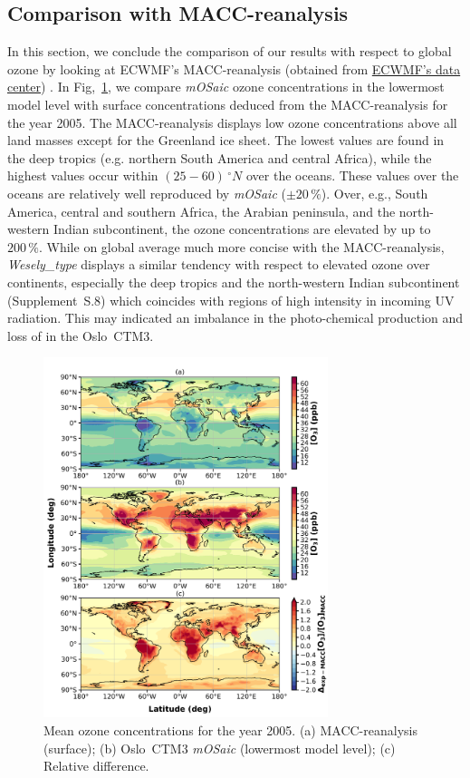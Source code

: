 \documentclass[gmd, manuscript]{copernicus}
\begin{document}
\subsection{Comparison with MACC-reanalysis}
\label{subsec:macc}
In this section, we conclude the comparison of our results with respect to global ozone by looking at ECWMF's MACC-reanalysis (obtained from \href{https://apps.ecmwf.int/datasets/data/macc-reanalysis/levtype=ml/}{ECWMF's data center}) \citep{MACC-II}.
In Fig,~\ref{fig:macc_o3conc}, we compare \emph{mOSaic} ozone concentrations in the lowermost model level with surface concentrations deduced from the MACC-reanalysis for the year 2005. The MACC-reanalysis displays low ozone concentrations above all land masses except for the Greenland ice sheet. The lowest values are found in the deep tropics (e.g. northern South America and central Africa), while the highest values occur within $(25-60)\,\unit{^\circ N}$ over the oceans. These values over the oceans are relatively well reproduced by \emph{mOSaic} ($\pm 20\,\unit{\%}$). Over, e.g., South America, central and southern Africa, the Arabian peninsula, and the north-western Indian subcontinent, the ozone concentrations are elevated by up to $200\,\unit{\%}$. While on global average much more concise with the MACC-reanalysis, \emph{Wesely\_type} displays a similar tendency with respect to elevated ozone over continents, especially the deep tropics and the north-western Indian subcontinent (Supplement~S.8) which coincides with regions of high intensity in incoming UV radiation. This may indicated an imbalance in the photo-chemical production and loss of  in the Oslo~CTM3.

\begin{figure}[t]
  \includegraphics[width=8.3cm]{fig08}
  \caption{Mean ozone concentrations for the year 2005. (a) MACC-reanalysis (surface); (b) Oslo~CTM3 \emph{mOSaic} (lowermost model level); (c) Relative difference.}
  \label{fig:macc_o3conc}
\end{figure}
\end{document}
